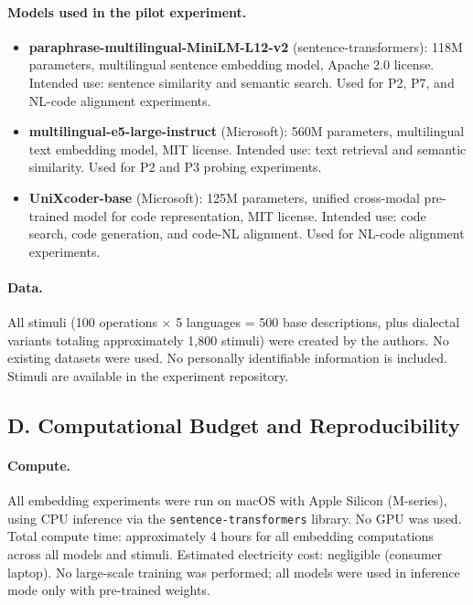 \documentclass[11pt]{article}
\theoremstyle{definition}
\begin{document}
\paragraph{Models used in the pilot experiment.}
\begin{itemize}[nosep]
  \item \textbf{paraphrase-multilingual-MiniLM-L12-v2} (sentence-transformers): 118M parameters, multilingual sentence embedding model, Apache 2.0 license. Intended use: sentence similarity and semantic search. Used for P2, P7, and NL-code alignment experiments.
  \item \textbf{multilingual-e5-large-instruct} (Microsoft): 560M parameters, multilingual text embedding model, MIT license. Intended use: text retrieval and semantic similarity. Used for P2 and P3 probing experiments.
  \item \textbf{UniXcoder-base} (Microsoft): 125M parameters, unified cross-modal pre-trained model for code representation, MIT license. Intended use: code search, code generation, and code-NL alignment. Used for NL-code alignment experiments.
\end{itemize}

\paragraph{Data.}
All stimuli (100 operations $\times$ 5 languages = 500 base descriptions, plus dialectal variants totaling approximately 1,800 stimuli) were created by the authors. No existing datasets were used. No personally identifiable information is included. Stimuli are available in the experiment repository.

\subsection*{D. Computational Budget and Reproducibility}

\paragraph{Compute.}
All embedding experiments were run on macOS with Apple Silicon (M-series), using CPU inference via the \texttt{sentence-transformers} library. No GPU was used. Total compute time: approximately 4 hours for all embedding computations across all models and stimuli. Estimated electricity cost: negligible (consumer laptop). No large-scale training was performed; all models were used in inference mode only with pre-trained weights.
\end{document}
